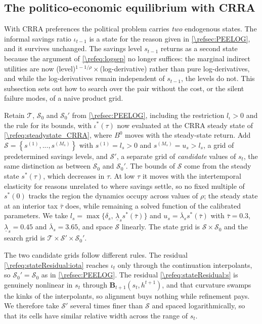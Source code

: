 \subsection{The politico-economic equilibrium with CRRA}\label{\refsec:PEE}
With CRRA preferences the political problem carries \emph{two} endogenous states. The informal savings ratio $\iota_{t-1}$ is a state for the reason given in \cref{\refsec:PEELOG}, and it survives unchanged. The savings level $s_{t-1}$ returns as a second state because the argument of \eqref{\refeq:logsep} no longer suffices: the marginal indirect utilities are now (level)$^{1-1/\rho}\times$(log-derivative) rather than pure log-derivatives, and while the log-derivatives remain independent of $s_{t-1}$, the levels do not. This subsection sets out how to search over the pair without the cost, or the silent failure modes, of a naive product grid.

Retain $\mathcal{T}$, $\mathcal{S}_0$ and $\mathcal{S}_0'$ from \cref{\refsec:PEELOG}, including the restriction $l_{\iota}>0$ and the rule for its bounds, with $\iota^*(\tau)$ now evaluated at the CRRA steady state of \eqref{\refeq:steadystate_CRRA}, where $B^0$ moves with the steady-state return. Add $\mathcal{S} = \left\lbrace s^{(1)},...,s^{(M_s)}\right\rbrace$ with $s^{(1)} = l_s>0$ and $s^{(M_s)} = u_s>l_s$, a grid of predetermined savings levels, and $\mathcal{S}'$, a separate grid of \emph{candidate} values of $s_t$, the same distinction as between $\mathcal{S}_0$ and $\mathcal{S}_0'$. The bounds of $\mathcal{S}$ come from the steady state $s^*(\tau)$, which decreases in $\tau$. At low $\tau$ it moves with the intertemporal elasticity for reasons unrelated to where savings settle, so no fixed multiple of $s^*(0)$ tracks the region the dynamics occupy across values of $\rho$; the steady state at an interior tax $\bar\tau$ does, while remaining a solved function of the calibrated parameters. We take $l_s = \max\lbrace\delta_s,\,\underline{\lambda}_s s^*(\bar\tau)\rbrace$ and $u_s = \overline{\lambda}_s s^*(\bar\tau)$ with $\bar\tau = 0.3$, $\underline{\lambda}_s = 0.45$ and $\overline{\lambda}_s = 3.65$, and space $\mathcal{S}$ linearly. The state grid is $\mathcal{S}\times\mathcal{S}_0$ and the search grid is $\mathcal{T}\times\mathcal{S}'\times\mathcal{S}_0'$.

The two candidate grids follow different rules. The residual \eqref{\refeq:stateResidual:iota} reaches $\iota_t$ only through the continuation interpolants, so $\mathcal{S}_0'=\mathcal{S}_0$ as in \cref{\refsec:PEELOG}. The residual \eqref{\refeq:stateResidual:s} is genuinely nonlinear in $s_t$ through $\bm{B}_{t+1}\left(s_t,h^{t+1}\right)$, and that curvature swamps the kinks of the interpolants, so alignment buys nothing while refinement pays. We therefore take $\mathcal{S}'$ several times finer than $\mathcal{S}$ and spaced logarithmically, so that its cells have similar relative width across the range of $s_t$.

